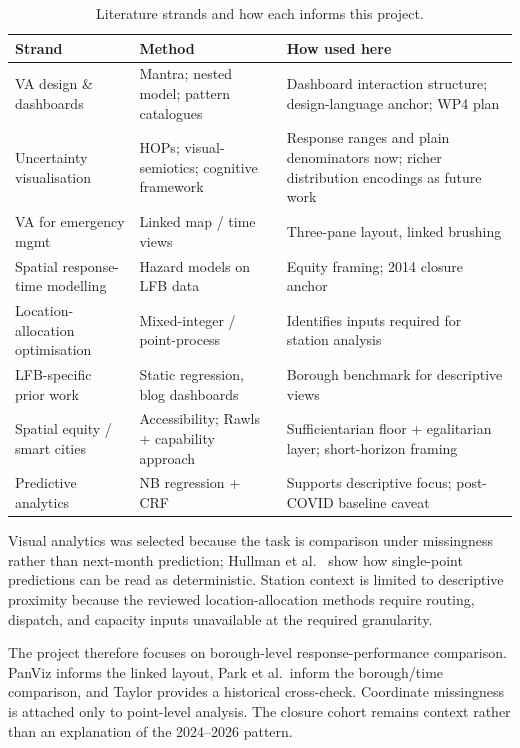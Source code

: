 \begin{table}[h]
\centering
\footnotesize
\begin{tabularx}{\textwidth}{p{3.2cm}p{3cm}X}
\toprule
Strand & Method & How used here \\
\midrule
VA design \& dashboards & Mantra; nested model; pattern catalogues & Dashboard interaction structure; design-language anchor; WP4 plan \\
Uncertainty visualisation & HOPs; visual-semiotics; cognitive framework & Response ranges and plain denominators now; richer distribution encodings as future work \\
VA for emergency mgmt & Linked map / time views & Three-pane layout, linked brushing \\
Spatial response-time modelling & Hazard models on LFB data & Equity framing; 2014 closure anchor \\
Location-allocation optimisation & Mixed-integer / point-process & Identifies inputs required for station analysis \\
LFB-specific prior work & Static regression, blog dashboards & Borough benchmark for descriptive views \\
Spatial equity / smart cities & Accessibility; Rawls + capability approach & Sufficientarian floor + egalitarian layer; short-horizon framing \\
Predictive analytics & NB regression + CRF & Supports descriptive focus; post-COVID baseline caveat \\
\bottomrule
\end{tabularx}
\caption{Literature strands and how each informs this project.}
\label{tab:litsynth}
\end{table}

Visual analytics was selected because the task is comparison under missingness rather than next-month prediction; Hullman et al.\ \cite{hullman2015hops} show how single-point predictions can be read as deterministic. Station context is limited to descriptive proximity because the reviewed location-allocation methods \cite{ocmola2018,beijing2021,reconfig2023} require routing, dispatch, and capacity inputs unavailable at the required granularity.

The project therefore focuses on borough-level response-performance comparison. PanViz informs the linked layout, Park et al.\ inform the borough/time comparison, and Taylor provides a historical cross-check. Coordinate missingness is attached only to point-level analysis. The closure cohort remains context rather than an explanation of the 2024--2026 pattern.
